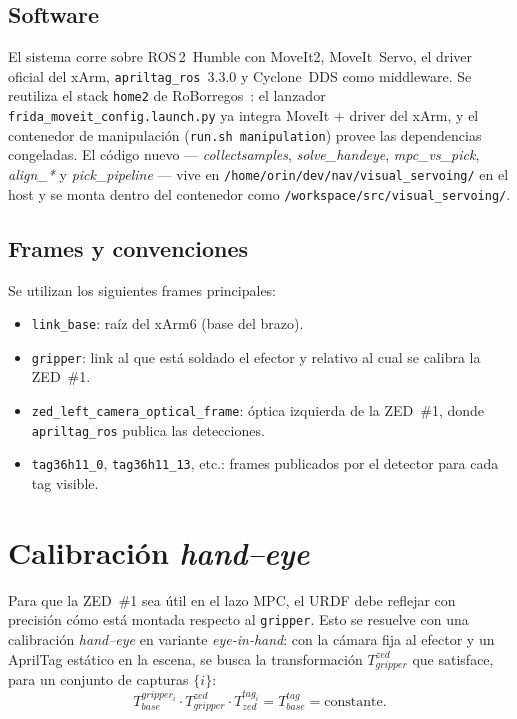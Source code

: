 \documentclass[conference]{IEEEtran}
\begin{document}
\subsection{Software}

El sistema corre sobre ROS\,2~Humble con MoveIt2, MoveIt~Servo, el
driver oficial del xArm, \texttt{apriltag\_ros}~3.3.0 y Cyclone~DDS
como middleware. Se reutiliza el stack \texttt{home2} de
RoBorregos~\cite{roborregos-home2}: el lanzador
\texttt{frida\_moveit\_config.launch.py} ya integra MoveIt + driver
del xArm, y el contenedor de manipulaci\'on (\texttt{run.sh
manipulation}) provee las dependencias congeladas. El c\'odigo
nuevo --- \emph{collectsamples}, \emph{solve\_handeye}, \emph{mpc\_vs\_pick},
\emph{align\_*} y \emph{pick\_pipeline} --- vive en
\texttt{/home/orin/dev/nav/visual\_servoing/} en el host y se monta
dentro del contenedor como \texttt{/workspace/src/visual\_servoing/}.

\subsection{Frames y convenciones}

Se utilizan los siguientes frames principales:

\begin{itemize}
  \item \texttt{link\_base}: ra\'iz del xArm6 (base del brazo).
  \item \texttt{gripper}: link al que est\'a soldado el efector y
        relativo al cual se calibra la ZED~\#1.
  \item \texttt{zed\_left\_camera\_optical\_frame}: \'optica izquierda
        de la ZED~\#1, donde \texttt{apriltag\_ros} publica las
        detecciones.
  \item \texttt{tag36h11\_0}, \texttt{tag36h11\_13}, etc.: frames
        publicados por el detector para cada tag visible.
\end{itemize}

\section{Calibraci\'on \emph{hand--eye}}

Para que la ZED~\#1 sea \'util en el lazo MPC, el URDF debe reflejar
con precisi\'on c\'omo est\'a montada respecto al \texttt{gripper}.
Esto se resuelve con una calibraci\'on \emph{hand--eye} en variante
\emph{eye-in-hand}: con la c\'amara fija al efector y un AprilTag
est\'atico en la escena, se busca la transformaci\'on
$T_{gripper}^{zed}$ que satisface, para un conjunto de capturas
$\{i\}$:
\begin{equation}
T_{base}^{gripper_i} \cdot T_{gripper}^{zed} \cdot
T_{zed}^{tag_i} = T_{base}^{tag} = \text{constante.}
\label{eq:handeye}
\end{equation}
\end{document}
